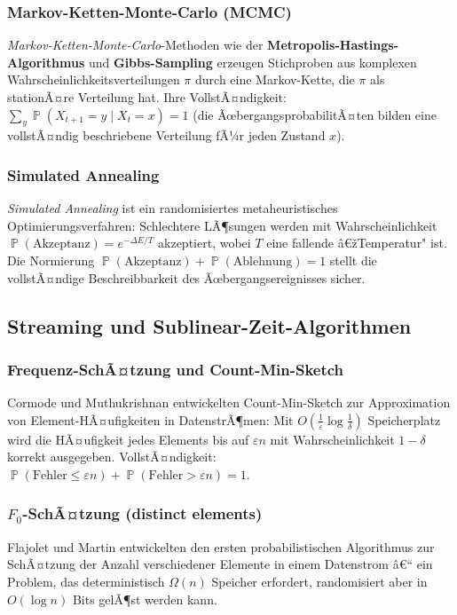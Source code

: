 ﻿\documentclass[12pt,a4paper]{article}
\theoremstyle{definition}
\theoremstyle{plain}
\theoremstyle{remark}
\DeclareMathOperator{\Prob}{\mathbb{P}}
\begin{document}
\subsubsection{Markov-Ketten-Monte-Carlo (MCMC)}
\emph{Markov-Ketten-Monte-Carlo}-Methoden wie der \textbf{Metropolis-Hastings-Algorithmus}
\cite{metropolis1953equation, hastings1970monte} und
\textbf{Gibbs-Sampling} erzeugen Stichproben aus komplexen
Wahrscheinlichkeitsverteilungen $\pi$ durch eine Markov-Kette, die $\pi$ als
stationÃ¤re Verteilung hat. Ihre VollstÃ¤ndigkeit:
$\sum_y \Prob(X_{t+1}=y \mid X_t=x) = 1$ (die ÃœbergangsprobabilitÃ¤ten bilden
eine vollstÃ¤ndig beschriebene Verteilung fÃ¼r jeden Zustand $x$).

\subsubsection{Simulated Annealing}
\emph{Simulated Annealing} \cite{kirkpatrick1983optimization} ist ein
randomisiertes metaheuristisches Optimierungsverfahren: Schlechtere
LÃ¶sungen werden mit Wahrscheinlichkeit
$\Prob(\text{Akzeptanz}) = e^{-\Delta E / T}$
akzeptiert, wobei $T$ eine fallende â€žTemperatur" ist. Die Normierung
$\Prob(\text{Akzeptanz}) + \Prob(\text{Ablehnung}) = 1$ stellt die
vollstÃ¤ndige Beschreibbarkeit des Ãœbergangsereignisses sicher.

\subsection{Streaming und Sublinear-Zeit-Algorithmen}

\subsubsection{Frequenz-SchÃ¤tzung und Count-Min-Sketch}
Cormode und Muthukrishnan \cite{cormode2005improved} entwickelten
Count-Min-Sketch zur Approximation von Element-HÃ¤ufigkeiten in DatenstrÃ¶men:
Mit $O(\frac{1}{\varepsilon} \log \frac{1}{\delta})$ Speicherplatz wird die
HÃ¤ufigkeit jedes Elements bis auf $\varepsilon n$ mit Wahrscheinlichkeit
$1-\delta$ korrekt ausgegeben. VollstÃ¤ndigkeit:
$\Prob(\text{Fehler} \leq \varepsilon n) + \Prob(\text{Fehler} > \varepsilon n)= 1$.

\subsubsection{$F_0$-SchÃ¤tzung (distinct elements)}
Flajolet und Martin \cite{flajolet1985probabilistic} entwickelten den ersten
probabilistischen Algorithmus zur SchÃ¤tzung der Anzahl verschiedener Elemente
in einem Datenstrom â€“ ein Problem, das deterministisch $\Omega(n)$ Speicher
erfordert, randomisiert aber in $O(\log n)$ Bits gelÃ¶st werden kann.
\end{document}
